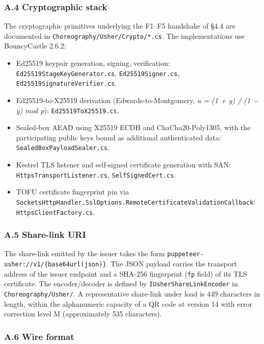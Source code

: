 \documentclass[
]{article}
\providecommand{\tightlist}{%
  \setlength{\itemsep}{0pt}\setlength{\parskip}{0pt}}
\begin{document}
\subsubsection{A.4 Cryptographic stack}\label{a.4-cryptographic-stack}

The cryptographic primitives underlying the F1--F5 handshake of §4.4 are
documented in \texttt{Choreography/Usher/Crypto/*.cs}. The
implementations use BouncyCastle 2.6.2:

\begin{itemize}
\tightlist
\item
  Ed25519 keypair generation, signing, verification:
  \texttt{Ed25519StageKeyGenerator.cs}, \texttt{Ed25519Signer.cs},
  \texttt{Ed25519SignatureVerifier.cs}.
\item
  Ed25519-to-X25519 derivation (Edwards-to-Montgomery, \emph{u = (1 + y)
  / (1 − y) mod p}): \texttt{Ed25519ToX25519.cs}.
\item
  Sealed-box AEAD using X25519 ECDH and ChaCha20-Poly1305, with the
  participating public keys bound as additional authenticated data:
  \texttt{SealedBoxPayloadSealer.cs}.
\item
  Kestrel TLS listener and self-signed certificate generation with SAN:
  \texttt{HttpsTransportListener.cs}, \texttt{SelfSignedCert.cs}.
\item
  TOFU certificate fingerprint pin via
  \texttt{SocketsHttpHandler.SslOptions.RemoteCertificateValidationCallback}:
  \texttt{HttpsClientFactory.cs}.
\end{itemize}

\subsubsection{A.5 Share-link URI}\label{a.5-share-link-uri}

The share-link emitted by the issuer takes the form
\texttt{puppeteer-usher://v1/\{base64url(json)\}}. The JSON payload
carries the transport address of the issuer endpoint and a SHA-256
fingerprint (\texttt{fp} field) of its TLS certificate. The
encoder/decoder is defined by \texttt{IUsherShareLinkEncoder} in
\texttt{Choreography/Usher/}. A representative share-link under load is
449 characters in length, within the alphanumeric capacity of a QR code
at version 14 with error correction level M (approximately 535
characters).

\subsubsection{A.6 Wire format}\label{a.6-wire-format}
\end{document}
